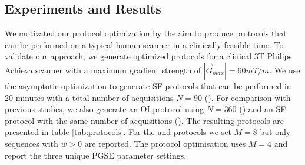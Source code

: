 \subsection*{Experiments and Results}
\begin{table}
\centering
\caption{PGSE settings of \SFshort{}, \SFlong{} and \OIlong{} protocols. $\perp$ and $\parallel$ mark acquisitions perpendicular and parallel to the fibre bundles.}
\hspace{0.6cm}
\label{tab:protocols}
\end{table}
We motivated our protocol optimization by the aim to produce protocols that can be performed on a typical human scanner in a clinically feasible time. To validate our approach, we generate optimized protocols for a clinical 3T Philips Achieva scanner with a maximum gradient strength of $|\vec{G}_{max}|=60mT/m$. We use the asymptotic optimization to generate SF protocols that can be performed in 20 minutes with a total number of acquisitions $N=90$ (\SFshort). For comparison with previous studies, we also generate an OI protocol using $N=360$ (\OIlong) and an SF protocol with the same number of acquisitions (\SFlong). The resulting protocols are presented in table \ref{tab:protocols}. For the \SFshort{} and \SFlong{} protocols we set $M=8$ but only sequences with $w>0$ are reported. The \OIlong{} protocol optimisation uses $M=4$ and report the three unique PGSE parameter settings.
